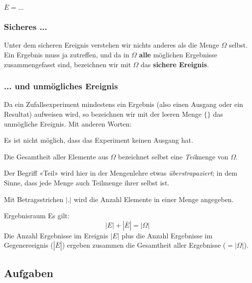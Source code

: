 $\bar{E} = ...$

\newpage

\subsubsection{Sicheres ...}
Unter dem sicheren Ereignis verstehen wir nichts anderes als die Menge
$\Omega$ selbst. Ein Ergebnis muss ja zutreffen, und da in $\Omega$
\textbf{alle} möglichen Ergebnisse zusammengefasst sind, bezeichnen
wir mit $\Omega$ das \textbf{sichere Ereignis}.

\subsubsection{... und unmögliches Ereignis}
Da ein Zufallsexperiment mindestens ein Ergebnis (also einen Ausgang
oder ein Resultat) aufweisen wird, so bezeichnen wir mit der leeren
Menge $\{\}$ das unmögliche Ereignis. Mit anderen Worten:

Es ist nicht möglich, dass das Experiment keinen Ausgang hat.


\begin{bemerkung}{}{}
Die Gesamtheit aller Elemente aus $\Omega$ bezeichnet selbst eine
\textit{Teil}menge von $\Omega$.

Der Begriff «Teil» wird hier in der Mengenlehre etwas \textit{überstrapaziert}; in dem Sinne, dass jede Menge auch
  Teilmenge ihrer selbst ist.
\end{bemerkung}

\begin{definition}{}{}
Mit Betragsstrichen $|.|$ wird die Anzahl Elemente in einer Menge angegeben.
\end{definition}

\begin{bemerkung}{Ergebnisraum}{}
  Es gilt: $$|E| + |{\bar{E}}| = |\Omega|$$
  Die Anzahl Ergebnisse im Ereignis $|E|$ plus die Anzahl Ergebnisse im Gegenereeignis ($|\bar{E}|$) ergeben zusammen die Gesamtheit aller Ergebnisse ($=|\Omega|$).
\end{bemerkung}

\subsection*{Aufgaben}

\newpage
